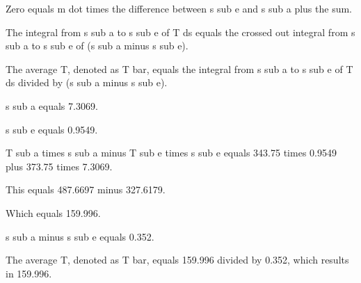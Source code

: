Zero equals m dot times the difference between s sub e and s sub a plus the sum.

The integral from s sub a to s sub e of T ds equals the crossed out integral from s sub a to s sub e of (s sub a minus s sub e).

The average T, denoted as T bar, equals the integral from s sub a to s sub e of T ds divided by (s sub a minus s sub e).

s sub a equals 7.3069.

s sub e equals 0.9549.

T sub a times s sub a minus T sub e times s sub e equals 343.75 times 0.9549 plus 373.75 times 7.3069.

This equals 487.6697 minus 327.6179.

Which equals 159.996.

s sub a minus s sub e equals 0.352.

The average T, denoted as T bar, equals 159.996 divided by 0.352, which results in 159.996.